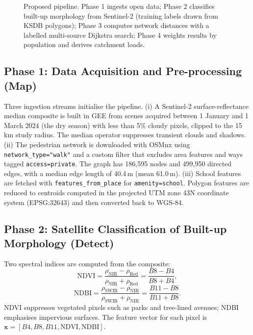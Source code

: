 \documentclass[conference]{IEEEtran}
\newcommand{\km}{\,km}
\newcommand{\m}{\,m}
\begin{document}
\begin{figure}[!t]
\caption{Proposed pipeline. Phase 1 ingests open data; Phase 2 classifies built-up morphology from Sentinel-2 (training labels drawn from KSDB polygons); Phase 3 computes network distances with a labelled multi-source Dijkstra search; Phase 4 weights results by population and derives catchment loads.}
\label{fig:pipeline}
\end{figure}

\subsection{Phase 1: Data Acquisition and Pre-processing (Map)}
Three ingestion streams initialise the pipeline. (i) A Sentinel-2 surface-reflectance median composite is built in GEE from scenes acquired between 1 January and 1 March 2024 (the dry season) with less than 5\% cloudy pixels, clipped to the 15\km{} study radius. The median operator suppresses transient clouds and shadows. (ii) The pedestrian network is downloaded with OSMnx using \texttt{network\_type="walk"} and a custom filter that excludes area features and ways tagged \texttt{access=private}. The graph has 186,595 nodes and 499,950 directed edges, with a median edge length of 40.4\m{} (mean 61.0\m{}). (iii) School features are fetched with \texttt{features\_from\_place} for \texttt{amenity=school}. Polygon features are reduced to centroids computed in the projected UTM zone 43N coordinate system (EPSG:32643) and then converted back to WGS-84.

\subsection{Phase 2: Satellite Classification of Built-up Morphology (Detect)}
Two spectral indices are computed from the composite:
\begin{equation}
\mathrm{NDVI}=\frac{\rho_{\mathrm{NIR}}-\rho_{\mathrm{Red}}}{\rho_{\mathrm{NIR}}+\rho_{\mathrm{Red}}}=\frac{B8-B4}{B8+B4},
\end{equation}
\begin{equation}
\mathrm{NDBI}=\frac{\rho_{\mathrm{SWIR}}-\rho_{\mathrm{NIR}}}{\rho_{\mathrm{SWIR}}+\rho_{\mathrm{NIR}}}=\frac{B11-B8}{B11+B8}.
\end{equation}
NDVI \cite{tucker1979} suppresses vegetated pixels such as parks and tree-lined avenues; NDBI \cite{zha2003} emphasises impervious surfaces. The feature vector for each pixel is $\mathbf{x}=[B4, B8, B11, \mathrm{NDVI}, \mathrm{NDBI}]$.
\end{document}
